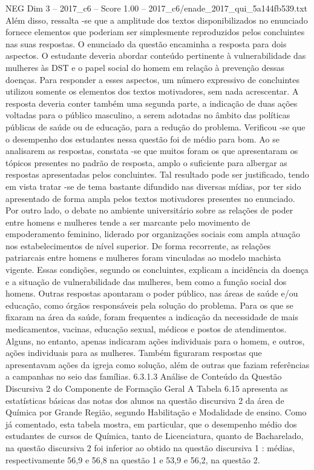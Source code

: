 \begin{textsample}{NEG Dim 3 – 2017\_c6 – Score 1.00 – 2017\_c6/enade\_2017\_qui\_5a144fb539.txt}
Além disso, ressalta -se que a amplitude dos textos disponibilizados no enunciado fornece elementos que poderiam ser simplesmente reproduzidos pelos concluintes nas suas respostas.
O enunciado da questão encaminha a resposta para dois aspectos.
O estudante deveria abordar conteúdo pertinente à vulnerabilidade das mulheres às DST e o papel social do homem em relação à prevenção dessas doenças.
Para responder a esses aspectos, um número expressivo de concluintes utilizou somente os elementos dos textos motivadores, sem nada acrescentar.
A resposta deveria conter também uma segunda parte, a indicação de duas ações voltadas para o público masculino, a serem adotadas no âmbito das políticas públicas de saúde ou de educação, para a redução do problema.
Verificou -se que o desempenho dos estudantes nessa questão foi de médio para bom.
Ao se analisarem as respostas, constata -se que muitos foram os que apresentaram os tópicos presentes no padrão de resposta, amplo o suficiente para albergar as respostas apresentadas pelos concluintes.
Tal resultado pode ser justificado, tendo em vista tratar -se de tema bastante difundido nas diversas mídias, por ter sido apresentado de forma ampla pelos textos motivadores presentes no enunciado.
Por outro lado, o debate no ambiente universitário sobre as relações de poder entre homens e mulheres tende a ser marcante pelo movimento de empoderamento feminino, liderado por organizações sociais com ampla atuação nos estabelecimentos de nível superior.
De forma recorrente, as relações patriarcais entre homens e mulheres foram vinculadas ao modelo machista vigente.
Essas condições, segundo os concluintes, explicam a incidência da doença e a situação de vulnerabilidade das mulheres, bem como a função social dos homens.
Outras respostas apontaram o poder público, nas áreas de saúde e/ou educação, como órgãos responsáveis pela solução do problema.
Para os que se fixaram na área da saúde, foram frequentes a indicação da necessidade de mais medicamentos, vacinas, educação sexual, médicos e postos de atendimentos.
Alguns, no entanto, apenas indicaram ações individuais para o homem, e outros, ações individuais para as mulheres.
Também figuraram respostas que apresentavam ações da igreja como solução, além de outras que faziam referências a campanhas no seio das famílias. 6.3.1.3 Análise de Conteúdo da Questão Discursiva 2 do Componente de Formação Geral A Tabela 6.15 apresenta as estatísticas básicas das notas dos alunos na questão discursiva 2 da área de Química por Grande Região, segundo Habilitação e Modalidade de ensino.
Como já comentado, esta tabela mostra, em particular, que o desempenho médio dos estudantes de cursos de Química, tanto de Licenciatura, quanto de Bacharelado, na questão discursiva 2 foi inferior ao obtido na questão discursiva 1 : médias, respectivamente 56,9 e 56,8 na questão 1 e 53,9 e 56,2, na questão 2.

\end{textsample}
